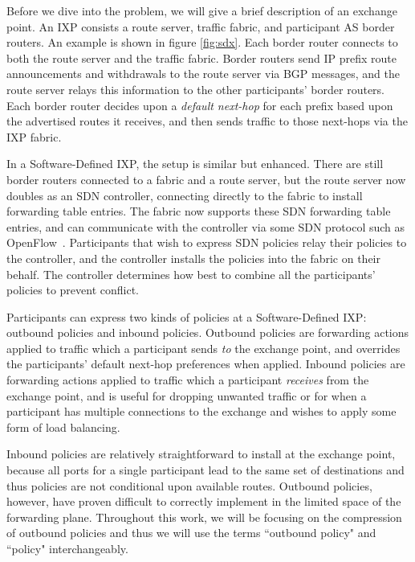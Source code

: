 Before we dive into the problem, we will give a brief description of an exchange point. An IXP consists a route server, traffic fabric, and participant AS border routers. An example is shown in figure \ref{fig:sdx}. Each border router connects to both the route server and the traffic fabric. Border routers send IP prefix route announcements and withdrawals to the route server via BGP messages, and the route server relays this information to the other participants' border routers. Each border router decides upon a \textit{default next-hop} for each prefix based upon the advertised routes it receives, and then sends traffic to those next-hops via the IXP fabric. 

In a Software-Defined IXP, the setup is similar but enhanced. There are still border routers connected to a fabric and a route server, but the route server now doubles as an SDN controller, connecting directly to the fabric to install forwarding table entries. The fabric now supports these SDN forwarding table entries, and can communicate with the controller via some SDN protocol such as OpenFlow~\cite{openflow}. Participants that wish to express SDN policies relay their policies to the controller, and the controller installs the policies into the fabric on their behalf. The controller determines how best to combine all the participants' policies to prevent conflict.

Participants can express two kinds of policies at a Software-Defined IXP: outbound policies and inbound policies. Outbound policies are forwarding actions applied to traffic which a participant sends \textit{to} the exchange point, and overrides the participants' default next-hop preferences when applied. Inbound policies are forwarding actions applied to traffic which a participant \textit{receives} from the exchange point, and is useful for dropping unwanted traffic or for when a participant has multiple connections to the exchange and wishes to apply some form of load balancing. 

Inbound policies are relatively straightforward to install at the exchange point, because all ports for a single participant lead to the same set of destinations and thus policies are not conditional upon available routes. Outbound policies, however, have proven difficult to correctly implement in the limited space of the forwarding plane. Throughout this work, we will be focusing on the compression of outbound policies and thus we will use the terms ``outbound policy" and ``policy" interchangeably. 
